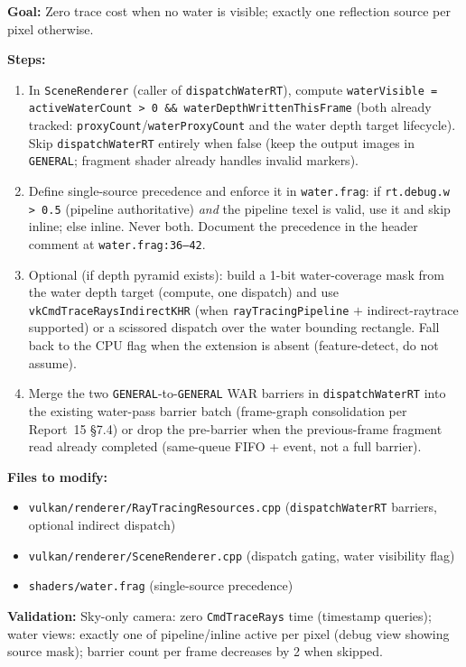 \documentclass[11pt,a4paper]{article}
\begin{document}
\begin{tcolorbox}[promptbox={Prompt: Conditional Water RT Dispatch with Single-Source Selection}]
\textbf{Goal:} Zero trace cost when no water is visible; exactly one reflection source per pixel otherwise.

\textbf{Steps:}
\begin{enumerate}
    \item In \texttt{SceneRenderer} (caller of \texttt{dispatchWaterRT}), compute \texttt{waterVisible = activeWaterCount \textgreater{} 0 \&\& waterDepthWrittenThisFrame} (both already tracked: \texttt{proxyCount}/\texttt{waterProxyCount} and the water depth target lifecycle). Skip \texttt{dispatchWaterRT} entirely when false (keep the output images in \texttt{GENERAL}; fragment shader already handles invalid markers).
    \item Define single-source precedence and enforce it in \texttt{water.frag}: if \texttt{rt.debug.w \textgreater{} 0.5} (pipeline authoritative) \textit{and} the pipeline texel is valid, use it and skip inline; else inline. Never both. Document the precedence in the header comment at \texttt{water.frag:36--42}.
    \item Optional (if depth pyramid exists): build a 1-bit water-coverage mask from the water depth target (compute, one dispatch) and use \texttt{vkCmdTraceRaysIndirectKHR} (when \texttt{rayTracingPipeline} $+$ indirect-raytrace supported) or a scissored dispatch over the water bounding rectangle. Fall back to the CPU flag when the extension is absent (feature-detect, do not assume).
    \item Merge the two \texttt{GENERAL}-to-\texttt{GENERAL} WAR barriers in \texttt{dispatchWaterRT} into the existing water-pass barrier batch (frame-graph consolidation per Report~15 \S7.4) or drop the pre-barrier when the previous-frame fragment read already completed (same-queue FIFO + event, not a full barrier).
\end{enumerate}

\textbf{Files to modify:}
\begin{itemize}
    \item \texttt{vulkan/renderer/RayTracingResources.cpp} (\texttt{dispatchWaterRT} barriers, optional indirect dispatch)
    \item \texttt{vulkan/renderer/SceneRenderer.cpp} (dispatch gating, water visibility flag)
    \item \texttt{shaders/water.frag} (single-source precedence)
\end{itemize}

\textbf{Validation:} Sky-only camera: zero \texttt{CmdTraceRays} time (timestamp queries); water views: exactly one of pipeline/inline active per pixel (debug view showing source mask); barrier count per frame decreases by 2 when skipped.
\end{tcolorbox}
\end{document}
